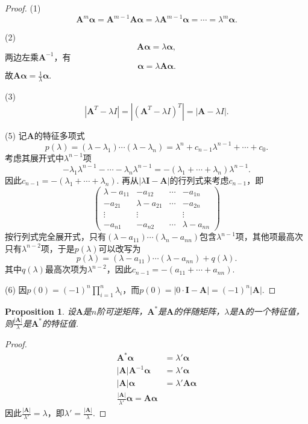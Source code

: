 \documentclass{article}
\newtheorem{proposition}[theorem]{Proposition}
\newcommand{\mbf}[1]{\bm{#1}}
\begin{document}
\begin{proof}
(1) 
$$
\mbf{A}^m \mbf{\alpha} = \mbf{A}^{m-1}\mbf{A}\mbf{\alpha} = \lambda  \mbf{A}^{m-1}\mbf{\alpha} = \cdots = \lambda^m \mbf{\alpha}. 
$$

(2)
$$
\mbf{A}\mbf{\alpha} = \lambda\mbf{\alpha}, 
$$
两边左乘$\mbf{A}^{-1}$，有
$$
\mbf{\alpha} = \lambda\mbf{A}\mbf{\alpha}.
$$
故$\mbf{A}\mbf{\alpha} = \frac{1}{\lambda}\mbf{\alpha}$.

(3)
$$
|\mbf{A}^T-\lambda I|= |(\mbf{A}^T-\lambda I)^T| = |\mbf{A}-\lambda I|.
$$

(5) 记$\mbf{A}$的特征多项式
$$
p(\lambda) = (\lambda-\lambda_1)\cdots(\lambda-\lambda_n) = \lambda^n + c_{n-1}\lambda^{n-1} + \cdots + c_0.
$$
考虑其展开式中$\lambda^{n-1}$项
$$
-\lambda_1\lambda^{n-1} - \cdots -\lambda_n\lambda^{n-1} = -(\lambda_1 + \cdots +\lambda_n)\lambda^{n-1}.
$$
因此$c_{n-1} = -(\lambda_1+ \cdots + \lambda_n)$. 再从$|\lambda\mbf{I}-\mbf{A}|$的行列式来考虑$c_{n-1}$，即
$$
\begin{pmatrix}
\lambda - a_{11} & -a_{12} & \cdots & -a_{1n} \\
-a_{21} & \lambda - a_{21} & \cdots & -a_{2n} \\
\vdots & \vdots && \vdots \\
-a_{n1} & -a_{n2} & \cdots & \lambda - a_{nn} 
\end{pmatrix}
$$
按行列式完全展开式，只有$(\lambda-a_{11})\cdots (\lambda_n - a_{nn})$包含$\lambda^{n-1}$项，其他项最高次只有$\lambda^{n-2}$项，于是$p(\lambda)$可以改写为
$$
p(\lambda) = (\lambda-a_{11})\cdots (\lambda - a_{nn}) + q(\lambda).
$$
其中$q(\lambda)$最高次项为$\lambda^{n-2}$，因此$c_{n-1}=-(a_{11} + \cdots + a_{nn})$. 

(6) 因$p(0) = (-1)^n\prod\limits_{i=1}^n \lambda_i$，而$p(0)=|0\cdot \mbf{I}-\mbf{A}| = (-1)^n|\mbf{A}| $.
\end{proof}

\begin{proposition}
\rm 设$\mbf{A}$是$n$阶可逆矩阵，$\mbf{A}^*$是$\mbf{A}$的伴随矩阵，$\lambda$是$\mbf{A}$的一个特征值，则$\frac{|\mbf{A}|}{\lambda}$是$\mbf{A}^*$的特征值.
\end{proposition}

\begin{proof}
$$
\begin{array}{ll}
\mbf{A}^*\mbf{\alpha} &= \lambda'\mbf{\alpha} \\
|\mbf{A}|\mbf{A}^{-1}\mbf{\alpha} &= \lambda'\mbf{\alpha} \\
|\mbf{A}|\mbf{\alpha} &= \lambda' \mbf{A}\mbf{\alpha} \\
\frac{|\mbf{A}|}{\lambda'} \mbf{\alpha} = \mbf{A}\mbf{\alpha}
\end{array}
$$
因此$\frac{|\mbf{A}|}{\lambda'} = \lambda$，即$\lambda' = \frac{|\mbf{A}|}{\lambda}$.
\end{proof}
\end{document}
